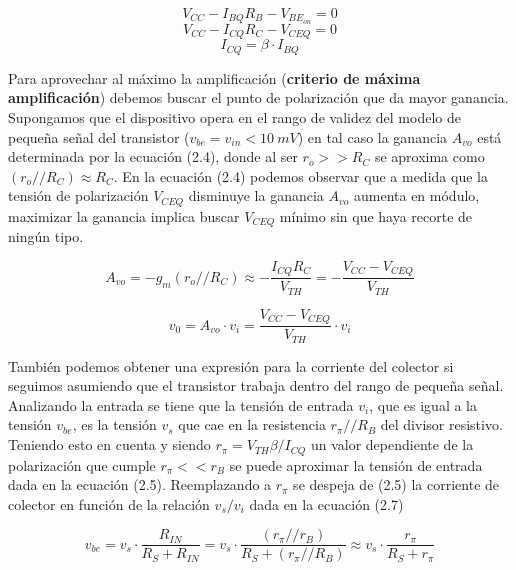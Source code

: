 \documentclass[a4paper, 10pt, spanish]{article}
\numberwithin{equation}{section}
\numberwithin{table}{section}
\begin{document}
\begin{equation}
V_{CC} - I_{BQ} R_B - V_{BE}_{on} = 0
\end{equation}
\begin{equation}
V_{CC} - I_{CQ} R_C - V_{CEQ} = 0
\end{equation}
\begin{equation} \label{eq:3}
I_{CQ} = \beta \cdot I_{BQ}
\end{equation}

Para aprovechar al máximo la amplificación (\textbf{criterio de máxima amplificación}) debemos buscar el punto de polarización que da mayor ganancia. Supongamos que el dispositivo opera en el rango de validez del modelo de pequeña señal del transistor ($v_{be} = v_{in} < 10\ mV$) en tal caso la ganancia $A_{vo}$ está determinada por la ecuación (2.4), donde al ser $r_o >> R_C$ se aproxima como $(r_o//R_C) \approx R_C$. En la ecuación (2.4) podemos observar que a medida que la tensión de polarización $V_{CEQ}$ disminuye la ganancia $A_{vo}$ aumenta en módulo, maximizar la ganancia implica buscar $V_{CEQ}$ mínimo sin que haya recorte de ningún tipo.

\begin{equation}
A_{vo} = -g_{m}(r_o // R_C) \approx -\frac{I_{CQ}R_C}{V_{TH}} = -\frac{V_{CC} - V_{CEQ}}{V_{TH}}
\end{equation}

\begin{equation}
v_0 = A_{vo}\cdot v_i = \frac{V_{CC} - V_{CEQ}}{V_{TH}} \cdot v_i
\end{equation}

También podemos obtener una expresión para la corriente del colector si seguimos asumiendo que el transistor trabaja dentro del rango de pequeña señal. Analizando la entrada se tiene que la tensión de entrada $v_i$, que es igual a la tensión $v_{be}$, es la tensión $v_s$ que cae en la resistencia $r_\pi//R_B$ del divisor resistivo. Teniendo esto en cuenta y siendo $r_\pi = V_{TH}\beta/I_{CQ}$ un valor dependiente de la polarización que cumple $r_\pi << r_B$ se puede aproximar la tensión de entrada dada en la ecuación (2.5). Reemplazando a $r_\pi$ se despeja de (2.5) la corriente de colector en función de la relación $v_s / v_i$ dada en la ecuación (2.7)

\begin{equation}
v_{be} =  v_s \cdot \frac{R_{IN}}{R_S + R_{IN}} = v_s \cdot \frac{(r_\pi//r_B)}{R_S + (r_\pi//R_B)} \approx v_s \cdot \frac{r_\pi}{R_S + r_\pi}
\end{equation}  
\end{document}
